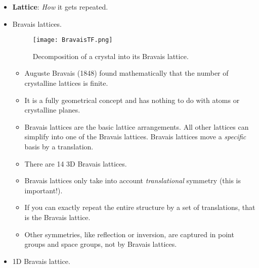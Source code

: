 \documentclass[../notes.tex]{subfiles}
\begin{document}
\begin{itemize}
    \item \textbf{Lattice}: \emph{How} it gets repeated.
    \item Bravais lattices.
    \begin{figure}[h!]
        \centering
        \texttt{[image: BravaisTF.png]}
        \caption{Decomposition of a crystal into its Bravais lattice.}
        \label{fig:BravaisTF}
    \end{figure}
    \begin{itemize}
        \item Auguste Bravais (1848) found mathematically that the number of crystalline lattices is finite.
        \item It is a fully geometrical concept and has nothing to do with atoms or crystalline planes.
        \item Bravais lattices are the basic lattice arrangements. All other lattices can simplify into one of the Bravais lattices. Bravais lattices move a \emph{specific} basis by a translation.
        \item There are 14 3D Bravais lattices.
        \item Bravais lattices only take into account \emph{translational} symmetry (this is important!).
        \item If you can exactly repeat the entire structure by a set of translations, that is the Bravais lattice.
        \item Other symmetries, like reflection or inversion, are captured in point groups and space groups, not by Bravais lattices.
    \end{itemize}
    \item 1D Bravais lattice.
    \begin{figure}[h!]
        \centering
\end{figure}
\end{itemize}
\end{document}
